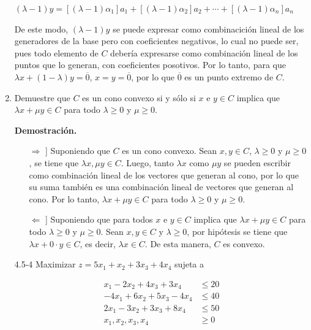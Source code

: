\documentclass[fleqn, 12pt]{article}
\begin{document}
\begin{enumerate}
		$ \left( \lambda - 1 \right) y = \left[\left( \lambda - 1 \right) \alpha_1\right] a_1 + \left[\left( \lambda - 1 \right) \alpha_2\right] a_2 + \cdots +\left[  \left( \lambda - 1 \right)\alpha_n \right] a_n $

		De este modo, $ \left( \lambda - 1 \right) y $ se puede expresar como combinacición lineal de los generadores de la base pero con coeficientes negativos, lo cual no puede ser, pues todo elemento de $ C $ debería expresarse como combinación lineal de los puntos que lo generan, con coeficientes posotivos. Por lo tanto, para que $ \lambda x + \left( 1 - \lambda \right) y = \overline{0} $, $ x = y = \overline{0} $, por lo que $ \overline{0} $ es un punto extremo de $ C $.

		\item Demuestre que $ C $ es un cono convexo si y sólo si $ x $ e $ y \in C $ implica que $ \lambda x + \mu y \in C $ para todo $ \lambda \geq 0 $ y $ \mu \geq 0 $.
		
		\textbf{Demostración.}

		\begin{itemize}
			\item[$ \Longrightarrow $ \hspace{-4mm} ]] Suponiendo que $ C $ es un cono convexo. Sean $ x, y \in C $, $ \lambda \geq 0 $ y $ \mu \geq 0 $, se tiene que $ \lambda x, \mu y \in C $. Luego, tanto $ \lambda x $ como $ \mu y $ se pueden escribir como combinación lineal de los vectores que generan al cono, por lo que su suma también es una combinación lineal de vectores que generan al cono. Por lo tanto, $ \lambda x + \mu y \in C $ para todo $ \lambda \geq 0 $ y $ \mu \geq 0 $.
			\item[$ \Longleftarrow $ \hspace{-4mm} ]] Suponiendo que para todos $ x $ e $ y \in C $ implica que $ \lambda x + \mu y \in C $ para todo $ \lambda \geq 0 $ y $ \mu \geq 0 $. Sean $ x,y \in C $ y $ \lambda \geq 0 $, por hipótesis se tiene que $ \lambda x + 0 \cdot y \in C $, es decir, $ \lambda x \in C $. De esta manera, $ C $ es convexo.
		\end{itemize}


		\newpage

		\item[4.5-4] Maximizar $ z = 5 x_1 + x_2 + 3 x_3 + 4 x_4 $ sujeta a
		
		\begin{align*}
			x_1    - 2 x_2 + 4 x_3 + 3 x_4 & \leq 20 \\
			-4 x_1 + 6 x_2 + 5 x_3 - 4 x_4 & \leq 40 \\
			2 x_1  - 3 x_2 + 3 x_3 + 8 x_4 & \leq 50 \\
			x_1, x_2, x_3, x_4 & \geq 0
		\end{align*}


\end{enumerate}
\end{document}
